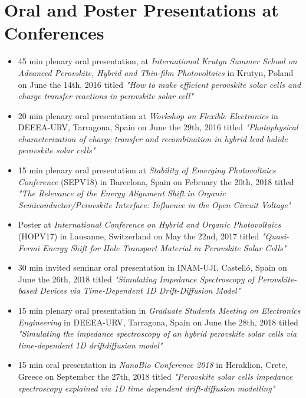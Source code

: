 \documentclass[b5paper, 12pt, openright]{book} %
\begin{document}
{\chapter{Oral and Poster Presentations at Conferences}
	\begin{itemize}
		\item 45 min plenary oral presentation, at \textit{International Krutyn Summer School on Advanced Perovskite, Hybrid and Thin-film Photovoltaics} in Krutyn, Poland on June the 14th, 2016 titled \textit{"How to make efficient perovskite solar cells and charge transfer reactions in perovskite solar cell"}
		\item 20 min plenary oral presentation at \textit{Workshop on Flexible Electronics} in DEEEA-URV, Tarragona, Spain on June the 29th, 2016 titled \textit{"Photophysical characterization of charge transfer and recombination in hybrid lead halide perovskite solar cells"}
		\item 15 min plenary oral presentation at \textit{Stability of Emerging Photovoltaics Conference} (SEPV18) in Barcelona, Spain on February the 20th, 2018 titled \textit{"The Relevance of the Energy Alignment Shift in Organic Semiconductor/Perovskite Interface: Influence in the Open Circuit Voltage"}
		\item Poster at \textit{International Conference on Hybrid and Organic Photovoltaics} (HOPV17) in Lausanne, Switzerland on May the 22nd, 2017 titled \textit{"Quasi-Fermi Energy Shift for Hole Transport Material in Perovskite Solar Cells"}
		\item 30 min invited seminar oral presentation in INAM-UJI, Castelló, Spain on June the 26th, 2018 titled \textit{"Simulating Impedance Spectroscopy of Perovskite-based Devices via Time-Dependent 1D Drift-Diffusion Model"}
		\item 15 min plenary oral presentation in \textit{Graduate Students Meeting on Electronics Engineering} in DEEEA-URV, Tarragona, Spain on June the 28th, 2018 titled \textit{"Simulating the impedance spectroscopy of an hybrid perovskite solar cells via time-dependent 1D driftdiffusion model"}
		\item 15 min oral presentation in \textit{NanoBio Conference 2018} in Heraklion, Crete, Greece on September the 27th, 2018 titled \textit{"Perovskite solar cells impedance spectroscopy explained via 1D time dependent drift-diffusion modelling"}
	\end{itemize}



	}%
\end{document}
